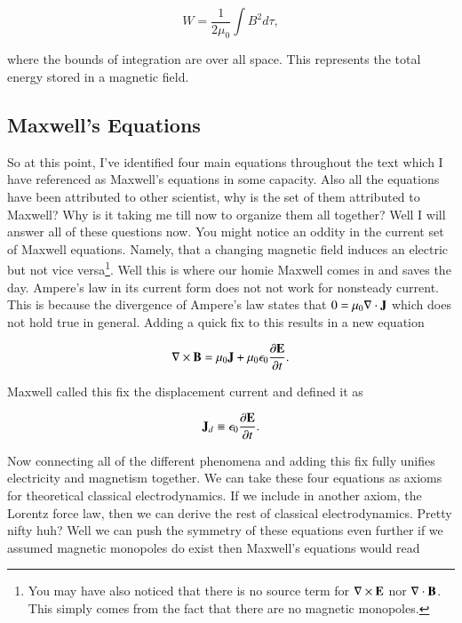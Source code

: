 \documentclass[preprint, review,12pt]{elsarticle}
\def\x{\times}
\def\.{\cdot}
\def\b{\textbf}
\def\={\equiv}
\def\curl{\nabla \x}
\newcommand{\pd}[2]{\frac{\partial #1 }{\partial #2}}
\begin{document}
\begin{equation}
    W = \frac{1}{2 \mu_0} \int B^2 d\tau,
\end{equation}

where the bounds of integration are over all space. This represents the total energy stored in a magnetic field. 

\subsection{Maxwell's Equations}

So at this point, I've identified four main equations throughout the text which I have referenced as Maxwell's equations in some capacity. Also all the equations have been attributed to other scientist, why is the set of them attributed to Maxwell? Why is it taking me till now to organize them all together? Well I will answer all of these questions now. You might notice an oddity in the current set of Maxwell equations. Namely, that a changing magnetic field induces an electric but not vice versa\footnote{You may have also noticed that there is no source term for $\nabla \x \b E$ nor $\nabla \. \b B$. This simply comes from the fact that there are no magnetic monopoles.}. Well this is where our homie Maxwell comes in and saves the day. Ampere's law in its current form does not not work for nonsteady current. This is because the divergence of Ampere's law states that $0 = \mu_0 \nabla \. \b J$ which does not hold true in general. Adding a quick fix to this results in a new equation

\begin{equation}
    \curl \b B = \mu_0 \b J + \mu_0 \epsilon_0 \pd{\b E}{t}.
\end{equation}

Maxwell called this fix the displacement current and defined it as 

\begin{equation}
    \b J_d \= \epsilon_0 \pd{\b E}{t}.
\end{equation}

Now connecting all of the different phenomena and adding this fix fully unifies electricity and magnetism together. We can take these four equations as axioms for theoretical classical electrodynamics. If we include in another axiom, the Lorentz force law, then we can derive the rest of classical electrodynamics. Pretty nifty huh? Well we can push the symmetry of these equations even further if we assumed magnetic monopoles do exist then Maxwell's equations would read
\end{document}
